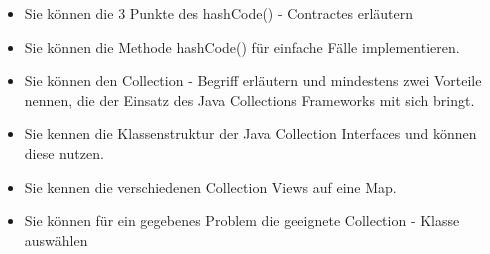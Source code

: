 \documentclass[a4paper, 10pt]{article}
\begin{document}
\begin{itemize}
  \item Sie können die 3 Punkte des hashCode() - Contractes erläutern \\
        
  \item Sie können die Methode hashCode() für einfache Fälle implementieren. \\
        
  \item Sie können den Collection - Begriff erläutern und mindestens zwei Vorteile nennen, die der Einsatz des Java Collections Frameworks mit sich bringt. \\
        
  \item Sie kennen die Klassenstruktur der Java Collection Interfaces und können diese nutzen. \\
        
  \item Sie kennen die verschiedenen Collection Views auf eine Map. \\
        
  \item Sie können für ein gegebenes Problem die geeignete Collection - Klasse auswählen \\
\end{itemize}
\end{document}
